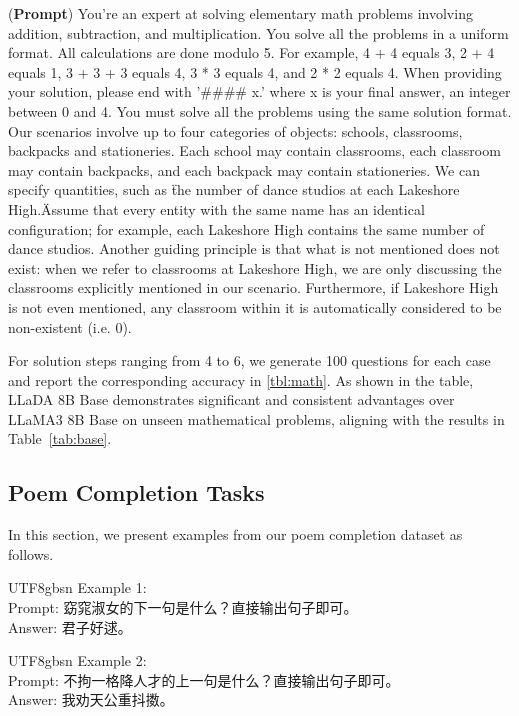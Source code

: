 \documentclass{article}
\begin{document}
\begin{framed}
    (\textbf{Prompt}) You're an expert at solving elementary math problems involving addition, subtraction, and multiplication. You solve all the problems in a uniform format. All calculations are done modulo 5. For example, 4 + 4 equals 3, 2 + 4 equals 1, 3 + 3 + 3 equals 4, 3 * 3 equals 4, and 2 * 2 equals 4. When providing your solution, please end with '\#\#\#\# x.' where x is your final answer, an integer between 0 and 4. You must solve all the problems using the same solution format. Our scenarios involve up to four categories of objects: schools, classrooms, backpacks and stationeries. Each school may contain classrooms, each classroom may contain backpacks, and each backpack may contain stationeries. We can specify quantities, such as \"the number of dance studios at each Lakeshore High.\" Assume that every entity with the same name has an identical configuration; for example, each Lakeshore High contains the same number of dance studios. Another guiding principle is that what is not mentioned does not exist: when we refer to classrooms at Lakeshore High, we are only discussing the classrooms explicitly mentioned in our scenario. Furthermore, if Lakeshore High is not even mentioned, any classroom within it is automatically considered to be non-existent (i.e. 0).
\end{framed}


For solution steps ranging from 4 to 6, we generate 100 questions for each case and report the corresponding accuracy in \cref{tbl:math}. As shown in the table, LLaDA 8B Base demonstrates significant and consistent advantages over LLaMA3 8B Base on unseen mathematical problems, aligning with the results in Table~\ref{tab:base}.

\subsection{Poem Completion Tasks}
\label{app:exp-poem}
In this section, we present examples from our poem completion dataset as follows.



\begin{CJK}{UTF8}{gbsn}
Example 1:\\
Prompt: 窈窕淑女的下一句是什么？直接输出句子即可。\\
Answer: 君子好逑。
\end{CJK}

\begin{CJK}{UTF8}{gbsn}
Example 2:\\
Prompt: 不拘一格降人才的上一句是什么？直接输出句子即可。\\
Answer: 我劝天公重抖擞。
\end{CJK}
\end{document}
